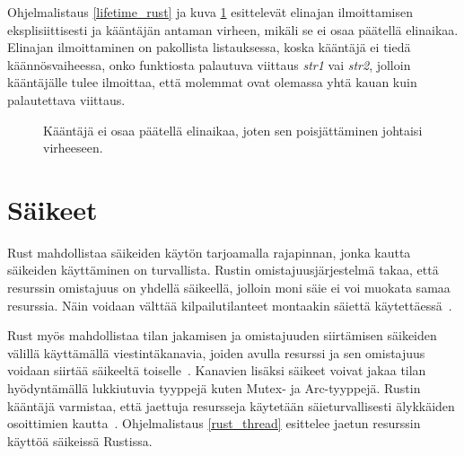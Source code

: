 Ohjelmalistaus \ref{lifetime_rust} ja kuva \ref{lifetime_error_rust} esittelevät elinajan ilmoittamisen eksplisiittisesti ja kääntäjän antaman virheen, mikäli se ei osaa päätellä elinaikaa. Elinajan ilmoittaminen on pakollista listauksessa, koska kääntäjä ei tiedä käännösvaiheessa, onko funktiosta palautuva viittaus \textit{str1} vai \textit{str2}, jolloin kääntäjälle tulee ilmoittaa, että molemmat ovat olemassa yhtä kauan kuin palautettava viittaus.

\begin{minipage}{\linewidth}

\end{minipage}

\begin{figure}[h]
  \caption{Kääntäjä ei osaa päätellä elinaikaa, joten sen poisjättäminen johtaisi virheeseen.}
  \label{lifetime_error_rust}
\end{figure}

\section{Säikeet}
Rust mahdollistaa säikeiden käytön tarjoamalla rajapinnan, jonka kautta säikeiden käyttäminen on turvallista. Rustin omistajuusjärjestelmä takaa, että resurssin omistajuus on yhdellä säikeellä, jolloin moni säie ei voi muokata samaa resurssia. Näin voidaan välttää kilpailutilanteet montaakin säiettä käytettäessä~\cite[chapter~16]{rustbook}. 

Rust myös mahdollistaa tilan jakamisen ja omistajuuden siirtämisen säikeiden välillä käyttämällä viestintäkanavia, joiden avulla resurssi ja sen omistajuus voidaan siirtää säikeeltä toiselle~\cite[chapter~16.2]{rustbook}. Kanavien lisäksi säikeet voivat jakaa tilan hyödyntämällä lukkiutuvia tyyppejä kuten Mutex- ja Arc-tyyppejä. Rustin kääntäjä varmistaa, että jaettuja resursseja käytetään säieturvallisesti älykkäiden osoittimien kautta~\cite[chapter~16.3]{rustbook}. Ohjelmalistaus \ref{rust_thread} esittelee jaetun resurssin käyttöä säikeissä Rustissa.


